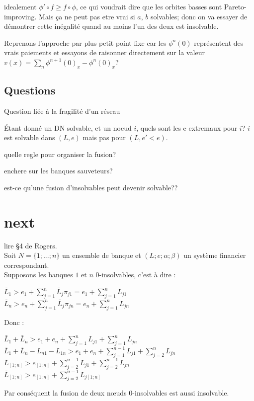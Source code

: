 \documentclass[11pt,oneside,twocolumn]{article}
\begin{document}

idealement $\phi'\circ f \geq f\circ\phi$, ce qui voudrait dire que
les orbites basses sont Pareto-improving. Mais ça ne peut pas etre vrai si $a$, $b$ solvables; donc on va essayer de démontrer cette inégalité quand au moins l'un des deux est insolvable.

Reprenons l'approche par plus petit point fixe car les $\phi^n(0)$ 
représentent des vrais paiements et essayons de raisonner directement
sur la valeur $v(x) = \sum_n \phi^{n+1}(0)_x-\phi^n(0)_x$?


\subsection{Questions}

Question liée à la fragilité d'un réseau

Étant donné un DN solvable, et un noeud $i$,
quels sont les e extremaux pour $i$?
$i$ est solvable dans $(L,e)$ mais pas
pour $(L,e'<e)$.

quelle regle pour organiser la fusion?

enchere sur les banques sauveteurs?

est-ce qu'une fusion d'insolvables 
peut devenir solvable??

\section{next}

lire \S4 de Rogers.\\

Soit $N = \lbrace 1;...; n\rbrace$ un ensemble de banque et $(L; e; \alpha; \beta)$ un système financier correspondant.\\
Supposons les banques $1$ et $n$ $0$-insolvables, c'est à dire :
\begin{center}
$\bar{L}_{1} > e_{1} + \sum_{j=1}^{n} \bar{L}_{j} \pi_{j1} = e_{1} + \sum_{j=1}^{n} L_{j1}$\\
$\bar{L}_{n} > e_{n} + \sum_{j=1}^{n} \bar{L}_{j} \pi_{jn} = e_{n} + \sum_{j=1}^{n} L_{jn}$
\end{center}
Donc :
\begin{center}
 $\bar{L}_{1} + \bar{L}_{n} > e_{1} + e_{n} + \sum_{j=1}^{n} L_{j1} + \sum_{j=1}^{n} L_{jn}$\\
$\bar{L}_{1} + \bar{L}_{n} - L_{n1} - L_{1n} > e_{1} + e_{n} + \sum_{j=1}^{n-1} L_{j1} + \sum_{j=2}^{n} L_{jn}$\\
$\bar{L}_{\left[ 1;n\right]} > e_{\left[ 1;n\right]} + \sum_{j=2}^{n-1} L_{j1} + \sum_{j=2}^{n-1} L_{jn}$ \\
$\bar{L}_{\left[ 1;n\right]} > e_{\left[ 1;n\right]} + \sum_{j=2}^{n-1} L_{j\left[ 1;n\right]}$
\end{center}
Par conséquent la fusion de deux nœuds $0$-insolvables est aussi insolvable.
\end{document}
